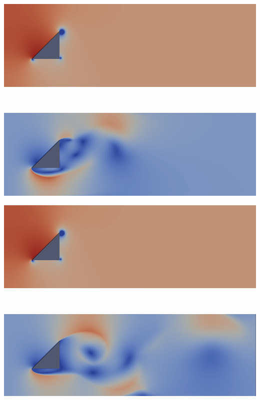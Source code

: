 \begin{refsection}
\begin{minipage}{0.5 \linewidth}
\end{minipage}
\begin{minipage}{0.5 \linewidth}
\includegraphics[width = \linewidth]{./OpenFOAM/pics/p1.png}
\end{minipage}\\
\begin{minipage}{0.5 \linewidth}
\includegraphics[width = \linewidth]{./OpenFOAM/pics/u25.png}
\end{minipage}
\begin{minipage}{0.5 \linewidth}
\includegraphics[width = \linewidth]{./OpenFOAM/pics/p1.png}
\end{minipage}\\
\begin{minipage}{0.5 \linewidth}
\includegraphics[width = \linewidth]{./OpenFOAM/pics/u55.png}

\end{minipage}
\end{refsection}
